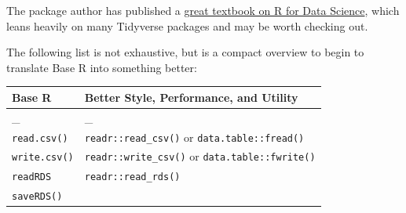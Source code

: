 \documentclass[]{book}
\begin{document}
The package author has published a \href{https://r4ds.had.co.nz/}{great
textbook on R for Data Science}, which leans heavily on many Tidyverse
packages and may be worth checking out.

The following list is not exhaustive, but is a compact overview to begin
to translate Base R into something better:

\begin{longtable}[]{@{}ll@{}}
\toprule
\begin{minipage}[b]{0.05\columnwidth}\raggedright\strut
Base R\strut
\end{minipage} & \begin{minipage}[b]{0.05\columnwidth}\raggedright\strut
Better Style, Performance, and Utility\strut
\end{minipage}\tabularnewline
\midrule
\endhead
\begin{minipage}[t]{0.05\columnwidth}\raggedright\strut
\_\strut
\end{minipage} & \begin{minipage}[t]{0.05\columnwidth}\raggedright\strut
\_\strut
\end{minipage}\tabularnewline
\begin{minipage}[t]{0.05\columnwidth}\raggedright\strut
\texttt{read.csv()}\strut
\end{minipage} & \begin{minipage}[t]{0.05\columnwidth}\raggedright\strut
\texttt{readr::read\_csv()} or \texttt{data.table::fread()}\strut
\end{minipage}\tabularnewline
\begin{minipage}[t]{0.05\columnwidth}\raggedright\strut
\texttt{write.csv()}\strut
\end{minipage} & \begin{minipage}[t]{0.05\columnwidth}\raggedright\strut
\texttt{readr::write\_csv()} or \texttt{data.table::fwrite()}\strut
\end{minipage}\tabularnewline
\begin{minipage}[t]{0.05\columnwidth}\raggedright\strut
\texttt{readRDS}\strut
\end{minipage} & \begin{minipage}[t]{0.05\columnwidth}\raggedright\strut
\texttt{readr::read\_rds()}\strut
\end{minipage}\tabularnewline
\begin{minipage}[t]{0.05\columnwidth}\raggedright\strut
\texttt{saveRDS()}\strut
\end{minipage} & \begin{minipage}[t]{0.05\columnwidth}\raggedright\strut

\end{minipage}
\end{longtable}
\end{document}
